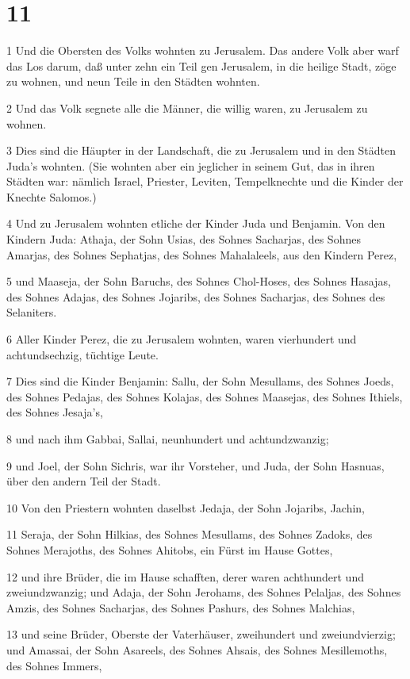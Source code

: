 \chapter{11}

\par 1 Und die Obersten des Volks wohnten zu Jerusalem. Das andere Volk aber warf das Los darum, daß unter zehn ein Teil gen Jerusalem, in die heilige Stadt, zöge zu wohnen, und neun Teile in den Städten wohnten.
\par 2 Und das Volk segnete alle die Männer, die willig waren, zu Jerusalem zu wohnen.
\par 3 Dies sind die Häupter in der Landschaft, die zu Jerusalem und in den Städten Juda's wohnten. (Sie wohnten aber ein jeglicher in seinem Gut, das in ihren Städten war: nämlich Israel, Priester, Leviten, Tempelknechte und die Kinder der Knechte Salomos.)
\par 4 Und zu Jerusalem wohnten etliche der Kinder Juda und Benjamin. Von den Kindern Juda: Athaja, der Sohn Usias, des Sohnes Sacharjas, des Sohnes Amarjas, des Sohnes Sephatjas, des Sohnes Mahalaleels, aus den Kindern Perez,
\par 5 und Maaseja, der Sohn Baruchs, des Sohnes Chol-Hoses, des Sohnes Hasajas, des Sohnes Adajas, des Sohnes Jojaribs, des Sohnes Sacharjas, des Sohnes des Selaniters.
\par 6 Aller Kinder Perez, die zu Jerusalem wohnten, waren vierhundert und achtundsechzig, tüchtige Leute.
\par 7 Dies sind die Kinder Benjamin: Sallu, der Sohn Mesullams, des Sohnes Joeds, des Sohnes Pedajas, des Sohnes Kolajas, des Sohnes Maasejas, des Sohnes Ithiels, des Sohnes Jesaja's,
\par 8 und nach ihm Gabbai, Sallai, neunhundert und achtundzwanzig;
\par 9 und Joel, der Sohn Sichris, war ihr Vorsteher, und Juda, der Sohn Hasnuas, über den andern Teil der Stadt.
\par 10 Von den Priestern wohnten daselbst Jedaja, der Sohn Jojaribs, Jachin,
\par 11 Seraja, der Sohn Hilkias, des Sohnes Mesullams, des Sohnes Zadoks, des Sohnes Merajoths, des Sohnes Ahitobs, ein Fürst im Hause Gottes,
\par 12 und ihre Brüder, die im Hause schafften, derer waren achthundert und zweiundzwanzig; und Adaja, der Sohn Jerohams, des Sohnes Pelaljas, des Sohnes Amzis, des Sohnes Sacharjas, des Sohnes Pashurs, des Sohnes Malchias,
\par 13 und seine Brüder, Oberste der Vaterhäuser, zweihundert und zweiundvierzig; und Amassai, der Sohn Asareels, des Sohnes Ahsais, des Sohnes Mesillemoths, des Sohnes Immers,
